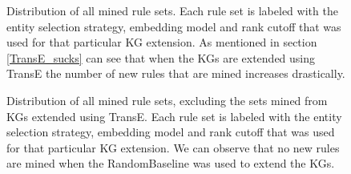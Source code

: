\begin{figure}[htbp]
\centering
    \centering
    
    \caption[Dist. of all sets of mined rules.]{Distribution of all mined rule sets. Each rule set is labeled with the entity selection strategy, embedding model and rank cutoff that was used for that particular KG extension. As mentioned in section \ref{TransE_sucks} can see that when the KGs are extended using TransE the number of new rules that are mined increases drastically.}
    \label{all_sets}
\end{figure}


\begin{figure}[htbp]
\centering
    \centering
    
    \caption[Dist. of all sets of mined rules, excluding TransE.]{Distribution of all mined rule sets, excluding the sets mined from KGs extended using TransE. Each rule set is labeled with the entity selection strategy, embedding model and rank cutoff that was used for that particular KG extension. We can observe that no new rules are mined when the RandomBaseline was used to extend the KGs.}
    \label{all_sets_w_out_TransE}
\end{figure}
\iffalse
